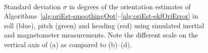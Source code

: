 \begin{figure}[t]
	\centering
	 \\
  \caption{Standard deviation $\sigma$ in degrees of the orientation estimates of Algorithms~\ref{alg:oriEst-smoothingOpt}--\ref{alg:oriEst-ekfOriError} in roll (blue), pitch (green) and heading (red) using simulated inertial and magnetometer measurements. Note the different scale on the vertical axis of (a) as compared to (b)--(d).}
  \label{fig:oriEst-oriSimResultsCovAll}
\end{figure}

